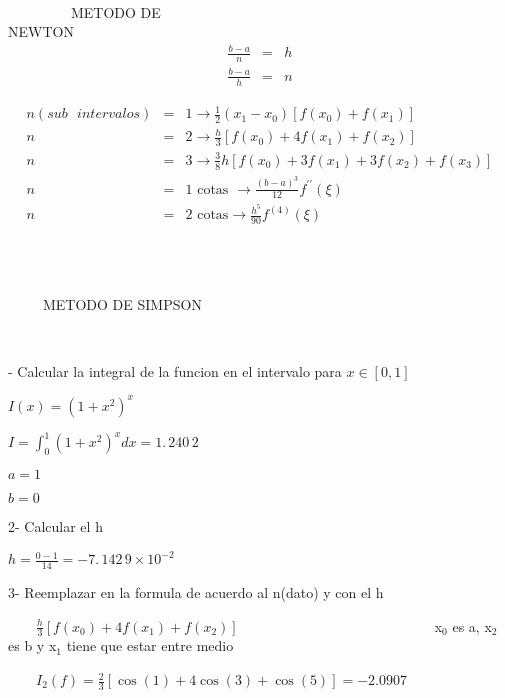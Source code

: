 \documentclass{article}
\begin{document}
\ \ \ \ \ \ \ \ \ \ \ \ \ \ \ \ \ \ \ \ \ \ \ \ \ \ \ \ \ \ \ \ \ \ \ \ \ \
\ \ \ \ \ \ \ \ \ \ \ \ \ \ \ \ \ \ \ \ \ \ \ \ \ \ \ \ \ \ \ \ \ \ \ \ \ \
\ \ \ \ \ METODO DE NEWTON\ \ \ \ \ \ \ \ \ \ \ \ \ \ \ \ \ \ \ \ \ \ \ \ \
\ \ \ \ \ \ \ \ \ \ \ \ \ \ \ \ \ \ \ \ \ 
\begin{eqnarray*}
\frac{b-a}{n} &=&h \\
\frac{b-a}{h} &=&n
\end{eqnarray*}

\begin{eqnarray*}
n(sub\text{ }intervalos) &=&1\rightarrow \frac{1}{2}(x_{1}-x_{0})\left[
f(x_{0})+f(x_{1})\right] \\
n &=&2\rightarrow \frac{h}{3}\left[ f(x_{0})+4f(x_{1})+f(x_{2})\right] \\
n &=&3\rightarrow \frac{3}{8}h\left[ f(x_{0})+3f(x_{1})+3f(x_{2})+f(x_{3})%
\right] \\
n &=&1\text{ cotas }\rightarrow \frac{(b-a)^{3}}{12}f^{\prime \prime }(\xi )
\\
n &=&2\text{ cotas}\rightarrow \frac{h^{5}}{90}f^{(4)}(\xi )
\end{eqnarray*}

\ \ \ \ \ \ \ \ \ \ \ \ \ \ \ \ \ \ \ \ \ \ \ \ \ \ \ \ \ \ \ \ \ \ \ \ \ \
\ \ \ \ \ \ \ \ \ \ \ \ \ \ \ \ \ \ \ \ \ \ \ \ \ \ \ \ \ \ 

\ \ \ \ \ \ \ \ \ \ \ \ \ \ \ \ \ \ \ \ \ \ \ \ \ \ \ \ \ \ \ \ \ \ \ \ \ \
\ \ \ \ \ \ \ \ \ \ \ \ \ \ \ \ \ \ \ \ \ \ \ \ \ \ \ \ \ \ \ \ \ \ \ \ \ \
\ METODO DE SIMPSON

\ \ \ \ \ \ \ \ \ \ \ \ \ \ \ 

- Calcular la integral de la funcion en el intervalo para $x\in %
\left[ 0,1\right] $

$I(x)=(1+x^{2})^{x}$

$I=\int_{0}^{1}(1+x^{2})^{x}dx=\allowbreak 1.\,\allowbreak 240\,2$

$a=1$

$b=0$

2- Calcular el h

$h=\frac{0-1}{14}=\allowbreak -7.\,\allowbreak 142\,9\times 10^{-2}$

3- Reemplazar en la formula de acuerdo al n(dato) y con el h

\ \ \ \ $\frac{h}{3}\left[ f(x_{0})+4f(x_{1})+f(x_{2})\right] \qquad \qquad
\qquad \qquad \qquad \qquad \qquad $x$_{0}$ es a, x$_{2}$ es b y x$_{1}$
tiene que estar entre medio

\ \ \ \ $I_{2}(f)=\frac{2}{3}\left[ \cos (1)+4\cos (3)+\cos (5)\right]
=-2.0907$
\end{document}
